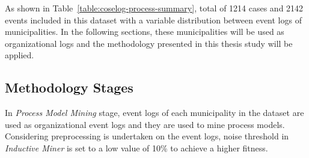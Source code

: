 As shown in Table~\ref{table:coselog-process-summary}, total of 1214 cases and 2142 events included in this dataset with a variable distribution between event logs of municipalities. In the following sections, these municipalities will be used as organizational logs and the methodology presented in this thesis study will be applied.

\subsection{Methodology Stages}
\label{sec:coselog-methodology}
In \textit{Process Model Mining} stage, event logs of each municipality in the dataset are used as organizational event logs and they are used to mine process models. Considering preprocessing is undertaken on the event logs, noise threshold in \textit{Inductive Miner} is set to a low value of 10\% to achieve a higher fitness. 

